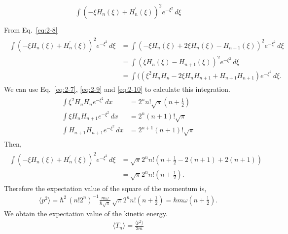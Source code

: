 \documentclass[floatfix,nofootinbib,superscriptaddress,fleqn]{revtex4-2}
\begin{document}
\begin{itemize}
\begin{align}
\begin{split}
      \int(-\xi H_n\left(\xi\right) 
      +H^\prime_n\left(\xi\right))^2 e^{-\xi^2}\,d\xi  \\
    \end{split}
  \end{align}
  From Eq.~\eqref{eq:2-8}
  \begin{align}
    \begin{split}
      \int(-\xi H_n\left(\xi\right) 
      +H^\prime_n\left(\xi\right))^2 e^{-\xi^2}\,d\xi
      &=\int(-\xi H_n\left(\xi\right) 
      + 2\xi H_n(\xi)-H_{n+1}(\xi))^2 e^{-\xi^2}\,d\xi  \\
      &=\int(\xi H_n\left(\xi\right) 
      -H_{n+1}(\xi))^2 e^{-\xi^2}\,d\xi \\
      &=\int(
      (\xi^2H_nH_n-2\xi H_nH_{n+1}+H_{n+1}H_{n+1})  
      e^{-\xi^2}\,d\xi.
    \end{split}
  \end{align}
  We can use Eq.~\eqref{eq:2-7}, \eqref{eq:2-9} and \eqref{eq:2-10} to calculate 
  this integration.
  \begin{align}
    \begin{split}
      \int \xi^2 H_n H_n e^{-\xi^2}\,dx 
      &= 2^nn!\sqrt{\pi}\left( n+\frac{1}{2} \right) \\  
      \int \xi H_n H_{n+1} e^{-\xi^2}\,dx 
      &= 2^n(n+1)!\sqrt{\pi}\\  
      \int  H_{n+1} H_{n+1} e^{-\xi^2}\,dx 
      &= 2^{n+1}(n+1)!\sqrt{\pi}
    \end{split}
  \end{align}
  Then,
  \begin{align}
    \begin{split}
      \int(-\xi H_n\left(\xi\right) 
      +H^\prime_n\left(\xi\right))^2 e^{-\xi^2}\,d\xi
      &= \sqrt{\pi}2^nn!
      \left(n+\frac{1}{2}-2(n+1)+2(n+1) \right) \\
      &= \sqrt{\pi}2^nn!\left( n+\frac{1}{2} \right).
    \end{split}
  \end{align}
  Therefore the expectation value of the square of the momentum is,
  \begin{align}
    \langle p^2\rangle = \hbar^2\,(n!2^n)^{-1}\frac{m\omega}{\hbar\sqrt{\pi}}\,
    \sqrt{\pi}2^nn!\left( n+\frac{1}{2} \right)
    =\hbar m\omega\left( n+\frac{1}{2} \right).
  \end{align}
  We obtain the expectation value of the kinetic energy.
  \begin{align}\label{eq:3-3}
    \langle T_n\rangle=\frac{\langle p^2\rangle}{2m}

\end{align}
\end{itemize}
\end{document}
